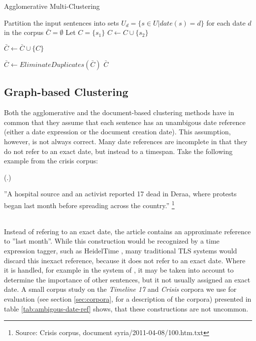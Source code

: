 \documentclass[a4paper,BCOR=10mm]{report}
\newcounter{quotecount}[chapter]
\newcommand{\countquote}[1]{\vspace{1cm}\refstepcounter{quotecount}%
     (\thechapter.\arabic{quotecount}) \hspace*{1cm} \parbox{9cm}{#1}\\[1cm]}
\numberwithin{lemma}{chapter}
\numberwithin{definition}{chapter}
\begin{document}
 \begin{algorithm}
 \caption{Agglomerative Multi-Clustering}
 \label{alg:multi-clustering}
 \begin{algorithmic}
    \STATE Partition the input sentences into sets $U_d = \{ s \in U | date(s) = d \}$ for each date $d$ in the corpus
    \STATE $\bar{C} = \emptyset$
            \STATE Let $C = \{  s_1 \}$
                    \STATE $C \leftarrow C \cup \{ s_2 \}$
                \ENDIF
            \ENDFOR

                \STATE $\bar{C} \leftarrow \bar{C} \cup \{ C \}$
            \ENDIF
        \ENDFOR

    \ENDFOR
    \STATE $\bar{C} \leftarrow \mathit{EliminateDuplicates}(\bar{C})$
    \RETURN $\bar{C}$

\end{algorithmic}
\end{algorithm}


\subsection{Graph-based Clustering}

Both the agglomerative and the document-based clustering methods have in common that they assume that each sentence has an unambigous date reference (either a date expression or the document creation date).
This assumption, however, is not always correct. Many date references are incomplete in that they do not refer to an exact date, but instead to a timespan. Take the following example from the crisis corpus:

\countquote{
''A hospital source and an activist reported 17 dead in Deraa, where protests began last month before spreading across the country.'' \footnote{Source: Crisis corpus, document syria/2011-04-08/100.htm.txt}
\label{quot:hospital}
}
Instead of refering to an exact date, the article contains an approximate reference to ''last month''. While this construction would be recognized by a time expression tagger, such as HeidelTime \citep{heideltime}, many traditional TLS systems would discard this inexact reference, because it does not refer to an exact date.
Where it is handled, for example in the system of \citet{chieu}, it may be taken into account to determine the importance of other sentences, but it not usually assigned an exact date.
A small corpus study on the \textit{Timeline 17} and \textit{Crisis} corpora we use for evaluation (see section \ref{sec:corpora}, for a description of the corpora) presented in table \ref{tab:ambigous-date-ref} shows, that these constructions are not uncommon.
\end{document}
